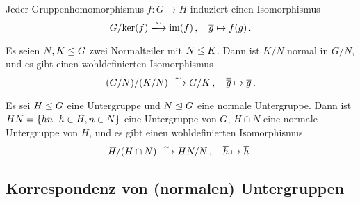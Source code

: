 \begin{corollary}[1.\ Isomorphiesatz]
  Jeder Gruppenhomomorphismus $f \colon G \to H$ induziert einen Isomorphismus
  \[
                            G/{\ker(f)}
    \xlongrightarrow{\sim}  \im(f) \,,
    \quad                   \class{g}
    \mapsto                 f(g) \,.
  \]
\end{corollary}

\begin{corollary}[2.\ Isomorphiesatz]
  Es seien $N, K \mathrel{\trianglelefteq} G$ zwei Normalteiler mit $N \mathrel{\leq} K$.
  Dann ist $K/N$ normal in $G/N$, und es gibt einen wohldefinierten Isomorphismus
  \[
                            (G/N)/(K/N)
    \xlongrightarrow{\sim}  G/K \,,
    \quad                   \class{ \class{g} }
    \mapsto                 \class{g} \,.
  \]
\end{corollary}

\begin{corollary}[3.\ Isomorphiesatz]
  Es sei $H \mathrel{\leq} G$ eine Untergruppe und $N \mathrel{\trianglelefteq} G$ eine normale Untergruppe.
  Dann ist $HN = \{hn \suchthat h \in H, n \in N\}$ eine Untergruppe von $G$, $H \cap N$ eine normale Untergruppe von $H$, und es gibt einen wohldefinierten Isomorphismus
  \[
                            H/(H \cap N)
    \xlongrightarrow{\sim}  HN/N \,,
    \quad                   \class{h}
    \mapsto                 \class{h} \,.
  \]
\end{corollary}



\subsection{Korrespondenz von (normalen) Untergruppen}

